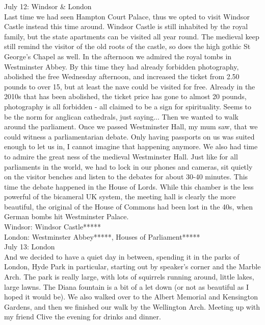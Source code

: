 July 12: Windsor \& London\\
Last time we had seen Hampton Court Palace, thus we opted to visit Windsor Castle instead this time around. Windsor Castle is still inhabited by the royal family, but the state apartments can be visited all year round. The medieval keep still remind the visitor of the old roots of the castle, so does the high gothic St George's Chapel as well. In the afternoon we admired the royal tombs in Westminster Abbey. By this time they had already forbidden photography, abolished the free Wednesday afternoon, and increased the ticket from 2.50 pounds to over 15, but at least the nave could be visited for free. Already in the 2010s that has been abolished, the ticket price has gone to almost 20 pounds, photography is all forbidden - all claimed to be a sign for spirituality. Seems to be the norm for anglican cathedrals, just saying... Then we wanted to walk around the parliament. Once we passed Westminster Hall, my mum saw, that we could witness a parliamentarian debate. Only having passports on us was suited enough to let us in, I cannot imagine that happening anymore. We also had time to admire the great ness of the medieval Westminster Hall. Just like for all parliaments in the world, we had to lock in our phones and cameras, sit quietly on the visitor benches and listen to the debates for about 30-40 minutes. This time the debate happened in the House of Lords. While this chamber is the less powerful of the bicameral UK system, the meeting hall is clearly the more beautiful, the original of the House of Commons had been lost in the 40s, when German bombs hit Westminster Palace.\\

Windsor: Windsor Castle*****\\
London: Westminster Abbey*****, Houses of Parliament*****\\

July 13: London\\
And we decided to have a quiet day in between, spending it in the parks of London, Hyde Park in particular, starting out by speaker's corner and the Marble Arch. The park is really large, with lots of squirrels running around, little lakes, large lawns. The Diana fountain is a bit of a let down (or not as beautiful as I hoped it would be). We also walked over to the Albert Memorial and Kensington Gardens, and then we finished our walk by the Wellington Arch. Meeting up with my friend Clive the evening for drinks and dinner.\\

